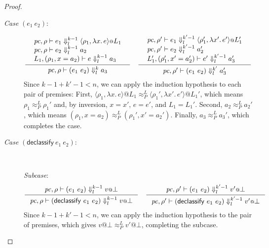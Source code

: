 \documentclass{article}
\makeatletter
\theoremstyle{definition}
\newcommand{\at}{\ensuremath{{\scriptstyle{@}}}}
\newcommand{\pc}{\ensuremath{{\mathit{pc}}}}
\makeatother
\begin{document}
\begin{proof}
\begin{description}
  \item[\emph{Case} $(e_1\ e_2)$:]
    \begin{gather*}
      \inference{
        {\begin{array}{l}
            \pc, \rho |- e_1 \Downarrow^{k-1}_{l}
            \langle{\rho_1, \lambda{x}.\, e\rangle} \at L_1
            \\
            \pc, \rho |- e_2 \Downarrow^{k-1}_{l} a_2
            \\
            L_1, (\rho_1, x = a_2) |- e \Downarrow^{k-1}_{l} a_3
          \end{array}}
      }{
        \pc, \rho |- (e_1\ e_2) \Downarrow^{k}_{l} a_3
      }
      \quad
      \inference{
        {\begin{array}{l}
            \pc, \rho' |- e_1 \Downarrow^{k'-1}_{l}
            \langle{\rho_1', \lambda{x'}.\, e'\rangle} \at L_1'
            \\
            \pc, \rho' |- e_2 \Downarrow^{k'-1}_{l} a_2'
            \\
            L_1', (\rho_1', x' = a_2') |- e' \Downarrow^{k'-1}_{l} a_3'
          \end{array}}
      }{
        \pc, \rho' |- (e_1\ e_2) \Downarrow^{k'}_{l} a_3'
      }
    \end{gather*}
    Since $k-1 + k'-1 < n$, we can apply the induction hypothesis to each
    pair of premises:
    First,
    $\langle{\rho_1, \lambda{x}.\, e\rangle} \at L_1
    \approx^{L}_{P}
    \langle{\rho_1', \lambda{x'}.\, e'\rangle} \at L_1'$,
    which means $\rho_1 \approx^{L}_{P} \rho_1'$ and, by inversion,
    $x = x'$, $e = e'$, and $L_1 = L_1'$.
    Second,
    $a_2 \approx^{L}_{P} a_2'$,
    which means
    $(\rho_1, x = a_2) \approx^{L}_{P} (\rho_1', x' = a_2')$.
    Finally,
    $a_3 \approx^{L}_{P} a_3'$,
    which completes the case.
    
  \item[\emph{Case} $(\mathsf{declassify}\ e_1\ e_2)$:]\
    
    \emph{Subcase}:
    \begin{gather*}
      \inference{
        \pc, \rho |- (e_1\ e_2) \Downarrow^{k-1}_{l} v \at \bot
      }{
        \pc, \rho |- (\mathsf{declassify}\ e_1\ e_2) \Downarrow^{k-1}_{l}
        v \at \bot
      }
      \quad
      \inference{
        \pc, \rho' |- (e_1\ e_2) \Downarrow^{k'-1}_{l} v' \at \bot
      }{
        \pc, \rho' |- (\mathsf{declassify}\ e_1\ e_2) \Downarrow^{k'-1}_{l}
        v' \at \bot
      }
    \end{gather*}
    Since $k - 1 + k' - 1 < n$, we can apply the induction hypothesis to
    the pair of premises, which gives
    $v \at \bot \approx^{L}_{P} v' \at \bot$, completing the subcase.


\end{description}
\end{proof}
\end{document}
